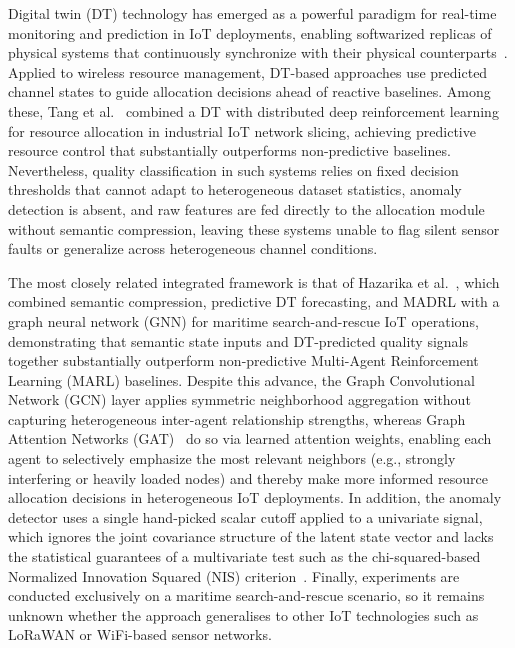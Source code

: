 \documentclass[conference]{IEEEtran}
\begin{document}
Digital twin (DT) technology has emerged as a powerful paradigm for
real-time monitoring and prediction in IoT deployments, enabling
softwarized replicas of physical systems that continuously synchronize
with their physical counterparts~\cite{ref_dt_iot}.
Applied to wireless resource management, DT-based approaches use predicted
channel states to guide allocation decisions ahead of reactive baselines.
Among these, Tang et al.~\cite{ref_dt_resource} combined a DT with distributed deep reinforcement learning
for resource allocation in industrial IoT network slicing, achieving predictive resource control that
substantially outperforms non-predictive baselines. Nevertheless,
quality classification in such systems relies on fixed decision thresholds that cannot
adapt to heterogeneous dataset statistics, anomaly detection is absent,
and raw features are fed directly to the allocation module without
semantic compression, leaving these systems unable to flag silent sensor
faults or generalize across heterogeneous channel conditions.

The most closely related integrated framework is that of Hazarika
et al.~\cite{ref_semadt}, which combined semantic compression, predictive
DT forecasting, and MADRL with a graph neural network (GNN)
for maritime search-and-rescue IoT operations, demonstrating that semantic
state inputs and DT-predicted quality signals together substantially outperform
non-predictive Multi-Agent Reinforcement Learning (MARL) baselines. Despite this advance, the Graph Convolutional Network (GCN) layer applies
symmetric neighborhood aggregation without capturing heterogeneous inter-agent
relationship strengths, whereas Graph Attention Networks (GAT)~\cite{ref_gat_comm}
do so via learned attention weights, enabling each agent to selectively
emphasize the most relevant neighbors (e.g., strongly interfering or
heavily loaded nodes) and thereby make more informed resource allocation
decisions in heterogeneous IoT deployments. In addition, the anomaly detector uses a single hand-picked scalar
cutoff applied to a univariate signal, which ignores the joint
covariance structure of the latent state vector and lacks the
statistical guarantees of a multivariate test such as the
chi-squared-based Normalized Innovation Squared (NIS) criterion~\cite{ref_ekf}.
Finally, experiments are conducted exclusively on a maritime
search-and-rescue scenario, so it remains unknown whether the
approach generalises to other IoT technologies such as LoRaWAN
or WiFi-based sensor networks.
\end{document}
